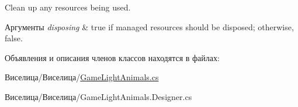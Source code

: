 Clean up any resources being used. 


\begin{DoxyParams}{Аргументы}
{\em disposing} & true if managed resources should be disposed; otherwise, false.\\
\hline
\end{DoxyParams}


Объявления и описания членов классов находятся в файлах\+:\begin{DoxyCompactItemize}
\item 
Виселица/Виселица/\hyperlink{_game_light_animals_8cs}{Game\+Light\+Animals.\+cs}\item 
Виселица/Виселица/Game\+Light\+Animals.\+Designer.\+cs\end{DoxyCompactItemize}
